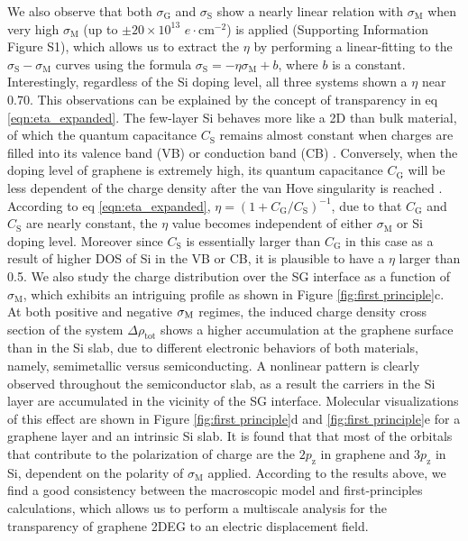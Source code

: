 \documentclass[journal=nalefd]{achemso}
\newcommand*\subs[1]{_{\text{#1}}} %
\begin{document}
We also observe that both $\sigma\subs{G}$ and $\sigma\subs{S}$ show a nearly linear relation with $\sigma\subs{M}$ when very high $\sigma\subs{M}$ (up to $\pm20\times10^{13}$ $e\cdot$cm$^{-2}$) is applied (Supporting Information Figure S1), which allows us to extract the $\eta$ by performing a linear-fitting to the $\sigma\subs{S}-\sigma\subs{M}$ curves using 
the formula $\sigma\subs{S}=-\eta \sigma\subs{M} + b$, where $b$ is a constant.
Interestingly, regardless of the Si doping level, all three systems shown a $\eta$ near 0.70.
This observations can be explained by the concept of transparency in eq \ref{eqn:eta_expanded}. 
The few-layer Si behaves more like a 2D than bulk material, of which the quantum 
capacitance $C\subs{S}$ remains almost constant when charges are filled into its 
valence band (VB) or conduction band (CB) \cite{Davies1997Physics}.
Conversely, when the doping level of graphene is extremely high, its quantum capacitance $C\subs{G}$ will be less dependent of the charge density after the van Hove singularity is reached \cite{Sarma2011Electronic}. 
According to eq \ref{eqn:eta_expanded}, $\eta=(1+C\subs{G}/C\subs{S})^{-1}$, due to that $C\subs{G}$ and $C\subs{S}$ are nearly constant, the $\eta$ value becomes independent of either $\sigma\subs{M}$ or Si doping level.
Moreover since $C\subs{S}$ is essentially larger than $C\subs{G}$ in this case as a result of higher DOS of Si in the VB or CB, it is plausible to have a $\eta$ larger than 0.5.
We also study the charge distribution over the SG interface as a function of $\sigma\subs{M}$, which exhibits an intriguing profile as shown in Figure \ref{fig:first principle}c. 
At both positive and negative $\sigma_{\rm M}$ regimes, the induced charge density cross section of the system $\Delta \rho\subs{tot}$ shows a higher accumulation at the graphene surface than in the Si slab, due to different electronic behaviors of both materials, namely, semimetallic versus semiconducting. 
A nonlinear pattern is clearly observed throughout the semiconductor slab, 
as a result the carriers in the Si layer are accumulated in the vicinity of the SG interface.
Molecular visualizations of this effect are shown in Figure \ref{fig:first principle}d and \ref{fig:first principle}e for a graphene layer and an intrinsic Si slab.
It is found that that most of the orbitals that contribute to the polarization of charge are the $2p\subs{z}$ in graphene and 
$3p\subs{z}$ in Si, dependent on the polarity of $\sigma\subs{M}$ applied. 
According to the results above, we find a good consistency between the macroscopic model and first-principles calculations, which allows us to perform a multiscale analysis for the transparency of graphene 2DEG to an electric displacement field. 
        
\end{document}
